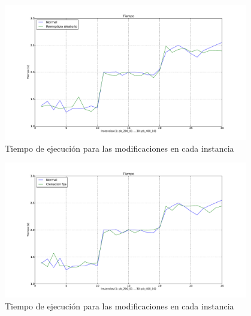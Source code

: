 \begin{figure}[H]
\begin{center}
\includegraphics[width=0.95\textwidth]{img/t-3.pdf}
\end{center}
\caption{Tiempo de ejecución para las modificaciones en cada instancia}
\label{fig:t-3}
\end{figure}

\begin{figure}[H]
\begin{center}
\includegraphics[width=0.95\textwidth]{img/t-4.pdf}
\end{center}
\caption{Tiempo de ejecución para las modificaciones en cada instancia}
\label{fig:t-4}
\end{figure}
